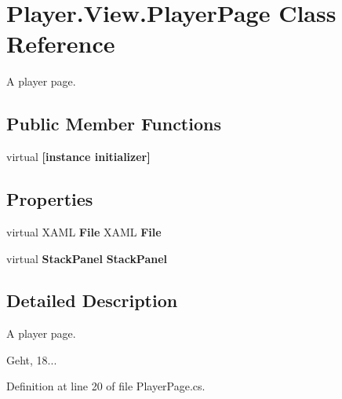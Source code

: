 \section{Player.\-View.\-Player\-Page Class Reference}
\label{class_player_1_1_view_1_1_player_page}


A player page.  


\subsection*{Public Member Functions}
\begin{DoxyCompactItemize}
\item 
virtual {\bfseries [instance initializer]}\label{class_player_1_1_view_1_1_player_page_abb276a9fc5d077551c630c85eee8d29f}

\end{DoxyCompactItemize}
\subsection*{Properties}
\begin{DoxyCompactItemize}
\item 
virtual X\-A\-M\-L {\bf File} X\-A\-M\-L {\bfseries File}\hspace{0.3cm}{\ttfamily  [get, set]}\label{class_player_1_1_view_1_1_player_page_abb398da657775c6f06d5c86038eeb287}

\item 
virtual {\bf Stack\-Panel} {\bfseries Stack\-Panel}\hspace{0.3cm}{\ttfamily  [get, set]}\label{class_player_1_1_view_1_1_player_page_a4cabead14e173f48e4c254d542479d40}

\end{DoxyCompactItemize}


\subsection{Detailed Description}
A player page. 

Geht, 18... 

Definition at line 20 of file Player\-Page.\-cs.

